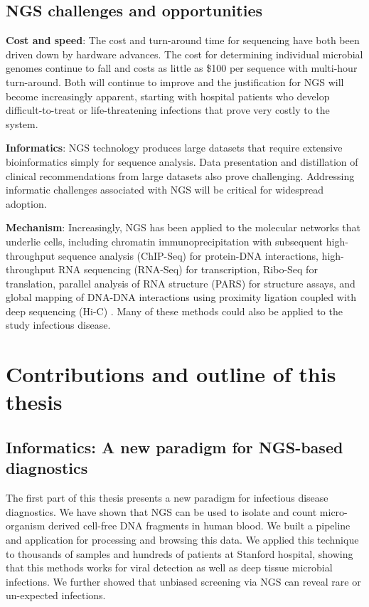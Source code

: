 \subsection{NGS challenges and opportunities}

\textbf{Cost and speed}: The cost and turn-around time for sequencing have both been driven down by hardware advances. The cost for determining individual microbial genomes continue to fall and costs as little as \$100 per sequence \cite{Fox:2014fj} with multi-hour turn-around. Both will continue to improve and the justification for NGS will become increasingly apparent, starting with hospital patients who develop difficult-to-treat or life-threatening infections that prove very costly to the system.

\textbf{Informatics}: NGS technology produces large datasets that require extensive bioinformatics simply for sequence analysis. Data presentation and distillation of clinical recommendations from large datasets also prove challenging. Addressing informatic challenges associated with NGS will be critical for widespread adoption.
 
\textbf{Mechanism}: Increasingly, NGS has been applied to the molecular networks that underlie cells, including chromatin immunoprecipitation with subsequent high-throughput sequence analysis (ChIP-Seq) for protein-DNA interactions, high-throughput RNA sequencing (RNA-Seq) for transcription, Ribo-Seq for translation, parallel analysis of RNA structure (PARS) for structure assays, and global mapping of DNA-DNA interactions using proximity ligation coupled with deep sequencing (Hi-C) \cite{Shendure:2012et}. Many of these methods could also be applied to the study infectious disease. 

\section{Contributions and outline of this thesis}

\subsection{Informatics: A new paradigm for NGS-based diagnostics}

The first part of this thesis presents a new paradigm for infectious disease diagnostics. We have shown that NGS can be used to isolate and count micro-organism derived cell-free DNA fragments in human blood. We built a pipeline and application for processing and browsing this data. We applied this technique to thousands of samples and hundreds of patients at Stanford hospital, showing that this methods works for viral detection as well as deep tissue microbial infections. We further showed that unbiased screening via NGS can reveal rare or un-expected infections. 

